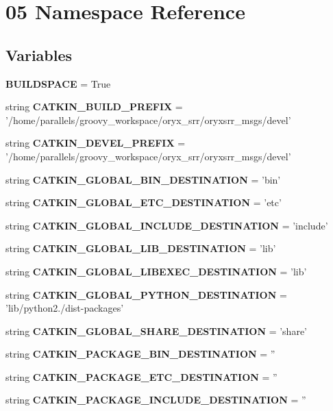 \section{05 \-Namespace \-Reference}
\label{namespace05}
\subsection*{\-Variables}
\begin{DoxyCompactItemize}
\item 
{\bf \-B\-U\-I\-L\-D\-S\-P\-A\-C\-E} = \-True
\item 
string {\bf \-C\-A\-T\-K\-I\-N\-\_\-\-B\-U\-I\-L\-D\-\_\-\-P\-R\-E\-F\-I\-X} = '/home/parallels/groovy\-\_\-workspace/oryx\-\_\-srr/oryxsrr\-\_\-msgs/devel'
\item 
string {\bf \-C\-A\-T\-K\-I\-N\-\_\-\-D\-E\-V\-E\-L\-\_\-\-P\-R\-E\-F\-I\-X} = '/home/parallels/groovy\-\_\-workspace/oryx\-\_\-srr/oryxsrr\-\_\-msgs/devel'
\item 
string {\bf \-C\-A\-T\-K\-I\-N\-\_\-\-G\-L\-O\-B\-A\-L\-\_\-\-B\-I\-N\-\_\-\-D\-E\-S\-T\-I\-N\-A\-T\-I\-O\-N} = 'bin'
\item 
string {\bf \-C\-A\-T\-K\-I\-N\-\_\-\-G\-L\-O\-B\-A\-L\-\_\-\-E\-T\-C\-\_\-\-D\-E\-S\-T\-I\-N\-A\-T\-I\-O\-N} = 'etc'
\item 
string {\bf \-C\-A\-T\-K\-I\-N\-\_\-\-G\-L\-O\-B\-A\-L\-\_\-\-I\-N\-C\-L\-U\-D\-E\-\_\-\-D\-E\-S\-T\-I\-N\-A\-T\-I\-O\-N} = 'include'
\item 
string {\bf \-C\-A\-T\-K\-I\-N\-\_\-\-G\-L\-O\-B\-A\-L\-\_\-\-L\-I\-B\-\_\-\-D\-E\-S\-T\-I\-N\-A\-T\-I\-O\-N} = 'lib'
\item 
string {\bf \-C\-A\-T\-K\-I\-N\-\_\-\-G\-L\-O\-B\-A\-L\-\_\-\-L\-I\-B\-E\-X\-E\-C\-\_\-\-D\-E\-S\-T\-I\-N\-A\-T\-I\-O\-N} = 'lib'
\item 
string {\bf \-C\-A\-T\-K\-I\-N\-\_\-\-G\-L\-O\-B\-A\-L\-\_\-\-P\-Y\-T\-H\-O\-N\-\_\-\-D\-E\-S\-T\-I\-N\-A\-T\-I\-O\-N} = 'lib/python2./dist-\/packages'
\item 
string {\bf \-C\-A\-T\-K\-I\-N\-\_\-\-G\-L\-O\-B\-A\-L\-\_\-\-S\-H\-A\-R\-E\-\_\-\-D\-E\-S\-T\-I\-N\-A\-T\-I\-O\-N} = 'share'
\item 
string {\bf \-C\-A\-T\-K\-I\-N\-\_\-\-P\-A\-C\-K\-A\-G\-E\-\_\-\-B\-I\-N\-\_\-\-D\-E\-S\-T\-I\-N\-A\-T\-I\-O\-N} = ''
\item 
string {\bf \-C\-A\-T\-K\-I\-N\-\_\-\-P\-A\-C\-K\-A\-G\-E\-\_\-\-E\-T\-C\-\_\-\-D\-E\-S\-T\-I\-N\-A\-T\-I\-O\-N} = ''
\item 
string {\bf \-C\-A\-T\-K\-I\-N\-\_\-\-P\-A\-C\-K\-A\-G\-E\-\_\-\-I\-N\-C\-L\-U\-D\-E\-\_\-\-D\-E\-S\-T\-I\-N\-A\-T\-I\-O\-N} = ''

\end{DoxyCompactItemize}

